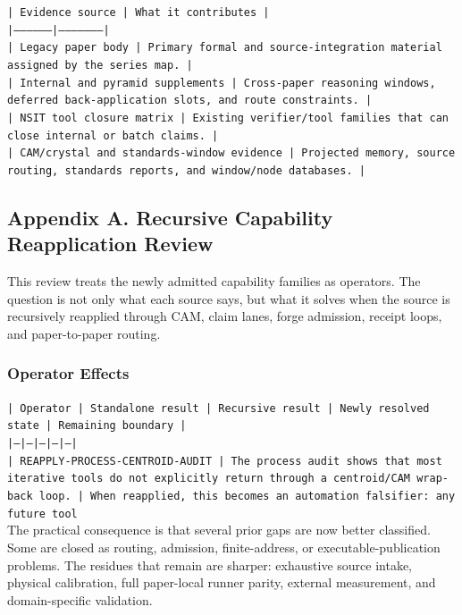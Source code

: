 \documentclass[11pt]{article}
\begin{document}
\noindent\texttt{| Evidence source | What it contributes |}\\
\noindent\texttt{|-----------------|---------------------|}\\
\noindent\texttt{| Legacy paper body | Primary formal and source-integration material assigned by the series map. |}\\
\noindent\texttt{| Internal and pyramid supplements | Cross-paper reasoning windows, deferred back-application slots, and route constraints. |}\\
\noindent\texttt{| NSIT tool closure matrix | Existing verifier/tool families that can close internal or batch claims. |}\\
\noindent\texttt{| CAM/crystal and standards-window evidence | Projected memory, source routing, standards reports, and window/node databases. |}\\

\subsection*{Appendix A. Recursive Capability Reapplication Review}

This review treats the newly admitted capability families as operators. The question is not only what each source says, but what it solves when the source is recursively reapplied through CAM, claim lanes, forge admission, receipt loops, and paper-to-paper routing.

\subsubsection*{Operator Effects}

\noindent\texttt{| Operator | Standalone result | Recursive result | Newly resolved state | Remaining boundary |}\\
\noindent\texttt{|---|---|---|---|---|}\\
\noindent\texttt{| REAPPLY-PROCESS-CENTROID-AUDIT | The process audit shows that most iterative tools do not explicitly return through a centroid/CAM wrap-back loop. | When reapplied, this becomes an automation falsifier: any future tool}\\

The practical consequence is that several prior gaps are now better classified. Some are closed as routing, admission, finite-address, or executable-publication problems. The residues that remain are sharper: exhaustive source intake, physical calibration, full paper-local runner parity, external measurement, and domain-specific validation.
\end{document}
